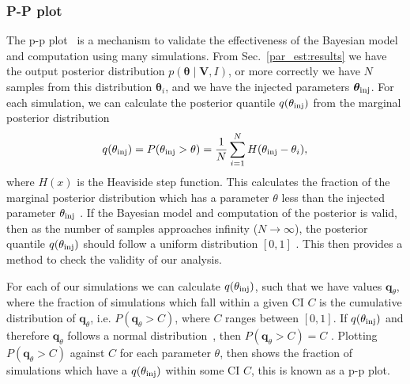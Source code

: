 \subsubsection{\label{par_est:results:simulations:ppplot}P-P plot}

The p-p plot~ is a
mechanism to validate the effectiveness of the Bayesian model and computation
using many simulations.  From Sec.~\ref{par_est:results} we have the output
posterior distribution $p(\bm{\theta} \mid \bm{V}, I)$, or more correctly we
have $N$ samples from this distribution $\bm{\theta}_i$, and we have the
injected parameters $\bm{\theta}_{\rm{inj}}$.  For each simulation, we can
calculate the posterior quantile $q(\theta_{\rm{inj}})$ from the marginal
posterior distribution
%
\begin{equation}
    q(\theta_{\rm{inj}}) = P(\theta_{\rm{inj}} > \theta) = \frac{1}{N} \sum_{i=1}^{N} H(\theta_{\rm{inj}} - \theta_i),
\end{equation}
%
where $H(x)$ is the Heaviside step function.  This calculates the fraction of
the marginal posterior distribution which has a parameter $\theta$ less than
the injected parameter $\theta_{\rm{inj}}$ \citep{cook2006ValidationSoftware}.
If the Bayesian model and computation of the posterior is valid, then as the
number of samples approaches infinity ($N \rightarrow \infty$), the posterior
quantile $q(\theta_{\rm{inj}})$ should follow a uniform distribution $[0,1]$
\citep{cook2006ValidationSoftware}.  This then provides a method to check the
validity of our analysis.

For each of our simulations we can calculate $q(\theta_{\rm{inj}})$, such that
we have values $\bm{q}_{\theta}$, where the fraction of simulations which fall
within a given \gls{CI} $C$ is the cumulative distribution of
$\bm{q}_{\theta}$, i.e. $P(\bm{q}_{\theta} > C)$, where $C$ ranges between
$[0,1]$.  If $q(\theta_{\rm{inj}})$ and therefore $\bm{q}_{\theta}$ follows a
normal distribution~, then $P(\bm{q}_{\theta} > C) = C$ \citep{cook2006ValidationSoftware}.
Plotting $P(\bm{q}_{\theta} > C)$ against $C$ for each parameter $\theta$, then
shows the fraction of simulations which have a $q(\theta_{\rm{inj}})$ within
some \gls{CI} $C$, this is known as a p-p plot.

